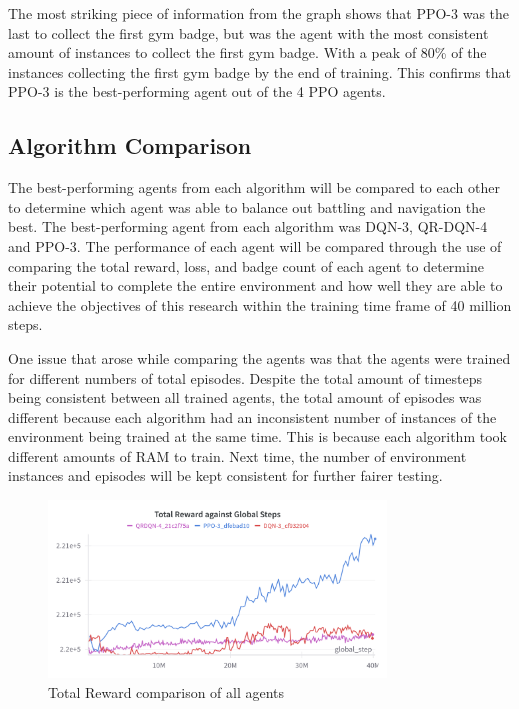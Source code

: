 The most striking piece of information from the graph shows that PPO-3 was the last to collect the first gym badge, but was the agent with the most consistent amount of instances to collect the first gym badge. With a peak of 80\% of the instances collecting the first gym badge by the end of training. This confirms that PPO-3 is the best-performing agent out of the 4 PPO agents.

\subsection{Algorithm Comparison}

The best-performing agents from each algorithm will be compared to each other to determine which agent was able to balance out battling and navigation the best. The best-performing agent from each algorithm was DQN-3, QR-DQN-4 and PPO-3. The performance of each agent will be compared through the use of comparing the total reward, loss, and badge count of each agent to determine their potential to complete the entire environment and how well they are able to achieve the objectives of this research within the training time frame of 40 million steps. 

One issue that arose while comparing the agents was that the agents were trained for different numbers of total episodes. Despite the total amount of timesteps being consistent between all trained agents, the total amount of episodes was different because each algorithm had an inconsistent number of instances of the environment being trained at the same time. This is because each algorithm took different amounts of RAM to train. Next time, the number of environment instances and episodes will be kept consistent for further fairer testing. 

\begin{figure}[H]
    \centering
    \includegraphics[width=0.8\textwidth]{figures/3_Total_Reward.png}
    \caption{Total Reward comparison of all agents}
    \label{fig:agent_eval_all_reward}
\end{figure}

